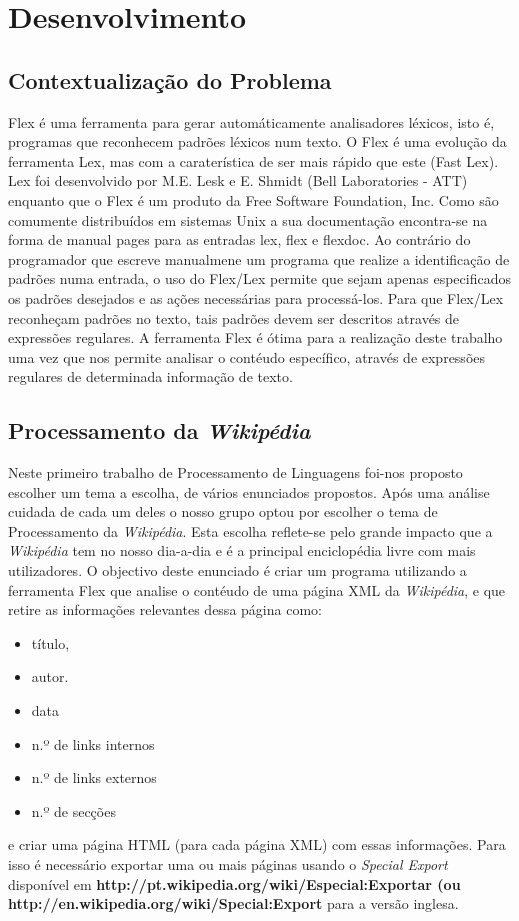 \documentclass[11pt, a4paper, oneside]{article}
\begin{document}
\newpage
\section{Desenvolvimento}

\subsection{Contextualização do Problema}

Flex é uma ferramenta para gerar automáticamente analisadores léxicos, isto é, programas que reconhecem padrões léxicos num texto. O Flex é uma evolução da ferramenta Lex, mas com a caraterística de ser mais rápido que este (Fast Lex). Lex foi desenvolvido por M.E. Lesk e E. Shmidt (Bell Laboratories - ATT) enquanto que o Flex é um produto da Free Software Foundation, Inc. Como são comumente distribuídos em sistemas Unix a sua documentação encontra-se na forma de manual pages para as entradas lex, flex e flexdoc. Ao contrário do programador que escreve manualmene um programa que realize a identificação de padrões numa entrada, o uso do Flex/Lex permite que sejam apenas especificados os padrões desejados e as ações necessárias para processá-los. Para que Flex/Lex reconheçam padrões no texto, tais padrões devem ser descritos através de expressões regulares. A ferramenta Flex é ótima para a realização deste trabalho uma vez que nos permite analisar o contéudo específico, através de expressões regulares de determinada informação de texto.

\subsection{Processamento da \textit{Wikipédia}}
Neste primeiro trabalho de Processamento de Linguagens foi-nos proposto escolher um tema a escolha, de vários enunciados propostos. Após uma análise cuidada  de cada um deles o nosso grupo optou por escolher o tema de Processamento da \textit{Wikipédia}. Esta escolha reflete-se pelo grande impacto que a \textit{Wikipédia} tem no nosso dia-a-dia e é a principal enciclopédia livre com mais utilizadores. 
O objectivo deste enunciado é criar um programa utilizando a ferramenta Flex que analise o contéudo de uma página XML da \textit{Wikipédia}, e que retire as informações relevantes dessa página como:
\begin{itemize}
\item título,
\item autor.
\item data
\item n.º de links internos
\item n.º de links externos
\item n.º de secções 
\end{itemize}
e criar uma página HTML (para cada página XML) com essas informações. Para isso é necessário exportar uma ou mais páginas usando o \textit{Special Export} disponível em \textbf{http://pt.wikipedia.org/wiki/Especial:Exportar (ou \\http://en.wikipedia.org/wiki/Special:Export} para a versão inglesa.
\newpage
\end{document}
